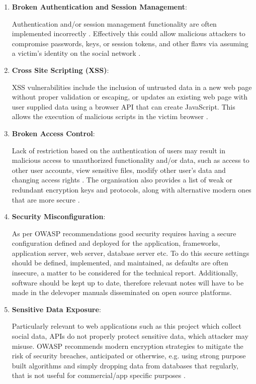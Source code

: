 \begin{enumerate}
    \item \textbf{Broken Authentication and Session Management}:
    
    Authentication and/or session management functionality are often implemented incorrectly \cite{OWASP2017}. Effectively this could allow malicious attackers to compromise passwords, keys, or session tokens, and other flaws via assuming a victim's identity on the social network \cite{OWASP2017}.
    

    \item \textbf{Cross Site Scripting (XSS)}:
    
    XSS vulnerabilities include the inclusion of untrusted data in a new web page without proper validation or escaping, or updates an existing web page with user supplied data using a browser API that can create JavaScript. This allows the execution of malicious scripts in the victim browser \cite{OWASP2017}.
    
    \newpage
    
    \item \textbf{Broken Access Control}:
    
    Lack of restriction based on the authentication of users may result in  malicious access to unauthorized functionality and/or data, such as access to other user accounts, view sensitive files, modify other user's data and  changing access rights \cite{OWASP2017}. The organisation also provides a list of weak or redundant encryption keys and protocols, along with alternative modern ones that are more secure \cite{OWASP2017}.
    
    \item \textbf{Security Misconfiguration}:
    
    As per OWASP \cite{OWASP2017} recommendations good security requires having a secure configuration defined and deployed for the application, frameworks, application server, web server, database server etc. To do this secure settings should be defined, implemented, and maintained, as defaults are often insecure, a matter to be considered for the technical report. Additionally, software should be kept up to date\cite{OWASP2017}, therefore relevant notes will have to be made in the delevoper manuals disseminated on open source platforms.
    
    \item \textbf{Sensitive Data Exposure}:
    
    Particularly relevant to web applications such as this project which collect social data, APIs do not properly protect sensitive data, which attacker may misuse. OWASP recommends modern encryption strategies to mitigate the risk of security breaches, anticipated or otherwise, e.g. using strong purpose built algorithms and simply dropping data from databases that regularly, that is not useful for commercial/app specific purposes \cite{OWASP2017}.
    

\end{enumerate}
